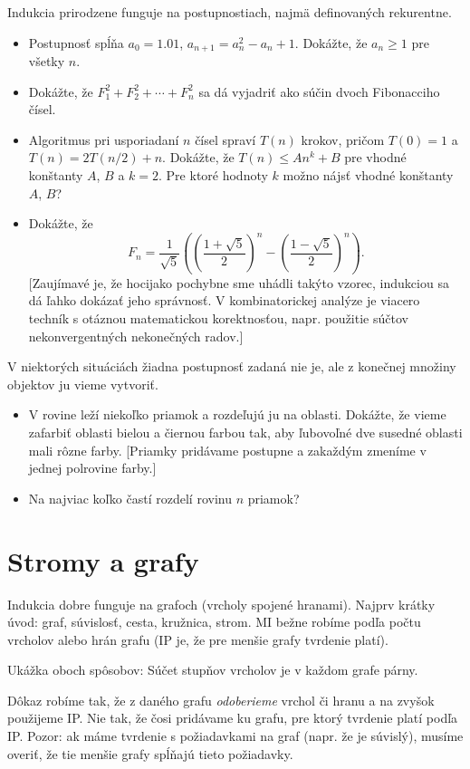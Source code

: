\documentclass[a4paper, 11pt]{article}
\begin{document}
Indukcia prirodzene funguje na postupnostiach, najmä definovaných rekurentne.
\begin{itemize}
\item Postupnosť spĺňa $a_0=1.01$, $a_{n+1} = a_n^2-a_n+1$. Dokážte, že $a_n\ge 1$ pre všetky $n$.
\item Dokážte, že $F_1^2+F_2^2+\cdots+F_n^2$ sa dá vyjadriť ako súčin dvoch Fibonacciho čísel.
\item Algoritmus pri usporiadaní $n$ čísel spraví $T(n)$ krokov, pričom $T(0) = 1$ a $T(n) = 2T(n/2) + n$. Dokážte, že $T(n)\le An^k+B$ pre vhodné konštanty $A$, $B$ a $k = 2$. Pre ktoré hodnoty $k$ možno nájsť vhodné konštanty $A$, $B$?
\item Dokážte, že
$$
    F_n =\frac{1}{\sqrt{5}} \left( \left( \frac{1 + \sqrt{5}}{2} \right)^n - \left( \frac{1 - \sqrt{5}}{2} \right)^n \right).
$$
[Zaujímavé je, že hocijako pochybne sme uhádli takýto vzorec, indukciou sa dá ľahko dokázať jeho správnosť. V kombinatorickej analýze je viacero techník s otáznou matematickou korektnosťou, napr. použitie súčtov nekonvergentných nekonečných radov.]
\end{itemize}

V niektorých situáciách žiadna postupnosť zadaná nie je, ale z konečnej množiny objektov ju vieme vytvoriť.
\begin{itemize}
\item V rovine leží niekoľko priamok a rozdeľujú ju na oblasti. Dokážte, že vieme zafarbiť oblasti bielou a čiernou farbou tak, aby ľubovoľné dve susedné oblasti mali rôzne farby. [Priamky pridávame postupne a zakaždým zmeníme v jednej polrovine farby.]
\item Na najviac koľko častí rozdelí rovinu $n$ priamok?
\end{itemize}


\section{Stromy a grafy}

Indukcia dobre funguje na grafoch (vrcholy spojené hranami). Najprv krátky úvod: graf, súvislosť, cesta, kružnica, strom.
MI bežne robíme podľa počtu vrcholov alebo hrán grafu (IP je, že pre menšie grafy tvrdenie platí).

Ukážka oboch spôsobov: Súčet stupňov vrcholov je v každom grafe párny.

Dôkaz robíme tak, že z daného grafu \emph{odoberieme} vrchol či hranu a na zvyšok použijeme IP.
Nie tak, že čosi pridávame ku grafu, pre ktorý tvrdenie platí podľa IP.
Pozor: ak máme tvrdenie s požiadavkami na graf (napr. že je súvislý), musíme overiť, že tie menšie grafy spĺňajú tieto požiadavky.
\end{document}
